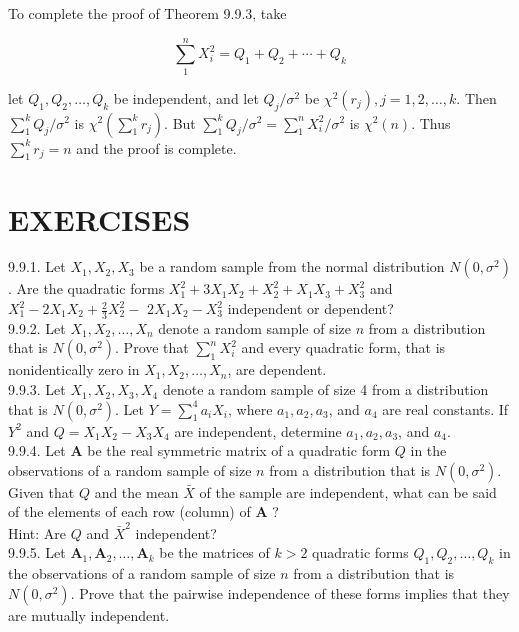 To complete the proof of Theorem 9.9.3, take

$$
\sum_{1}^{n} X_{i}^{2}=Q_{1}+Q_{2}+\cdots+Q_{k}
$$

let $Q_{1}, Q_{2}, \ldots, Q_{k}$ be independent, and let $Q_{j} / \sigma^{2}$ be $\chi^{2}\left(r_{j}\right), j=1,2, \ldots, k$. Then $\sum_{1}^{k} Q_{j} / \sigma^{2}$ is $\chi^{2}\left(\sum_{1}^{k} r_{j}\right)$. But $\sum_{1}^{k} Q_{j} / \sigma^{2}=\sum_{1}^{n} X_{i}^{2} / \sigma^{2}$ is $\chi^{2}(n)$. Thus $\sum_{1}^{k} r_{j}=n$ and the proof is complete.

\section*{EXERCISES}
9.9.1. Let $X_{1}, X_{2}, X_{3}$ be a random sample from the normal distribution $N\left(0, \sigma^{2}\right)$. Are the quadratic forms $X_{1}^{2}+3 X_{1} X_{2}+X_{2}^{2}+X_{1} X_{3}+X_{3}^{2}$ and $X_{1}^{2}-2 X_{1} X_{2}+\frac{2}{3} X_{2}^{2}-$ $2 X_{1} X_{2}-X_{3}^{2}$ independent or dependent?\\
9.9.2. Let $X_{1}, X_{2}, \ldots, X_{n}$ denote a random sample of size $n$ from a distribution that is $N\left(0, \sigma^{2}\right)$. Prove that $\sum_{1}^{n} X_{i}^{2}$ and every quadratic form, that is nonidentically zero in $X_{1}, X_{2}, \ldots, X_{n}$, are dependent.\\
9.9.3. Let $X_{1}, X_{2}, X_{3}, X_{4}$ denote a random sample of size 4 from a distribution that is $N\left(0, \sigma^{2}\right)$. Let $Y=\sum_{1}^{4} a_{i} X_{i}$, where $a_{1}, a_{2}, a_{3}$, and $a_{4}$ are real constants. If $Y^{2}$ and $Q=X_{1} X_{2}-X_{3} X_{4}$ are independent, determine $a_{1}, a_{2}, a_{3}$, and $a_{4}$.\\
9.9.4. Let $\boldsymbol{A}$ be the real symmetric matrix of a quadratic form $Q$ in the observations of a random sample of size $n$ from a distribution that is $N\left(0, \sigma^{2}\right)$. Given that $Q$ and the mean $\bar{X}$ of the sample are independent, what can be said of the elements of each row (column) of $\boldsymbol{A}$ ?\\
Hint: Are $Q$ and $\bar{X}^{2}$ independent?\\
9.9.5. Let $\boldsymbol{A}_{1}, \boldsymbol{A}_{2}, \ldots, \boldsymbol{A}_{k}$ be the matrices of $k>2$ quadratic forms $Q_{1}, Q_{2}, \ldots, Q_{k}$ in the observations of a random sample of size $n$ from a distribution that is $N\left(0, \sigma^{2}\right)$. Prove that the pairwise independence of these forms implies that they are mutually independent.\\
